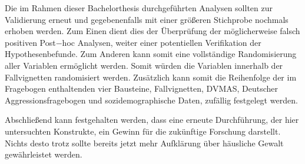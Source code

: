 Die im Rahmen dieser Bachelorthesis durchgeführten Analysen sollten zur Validierung erneut und gegebenenfalls mit einer größeren Stichprobe nochmals erhoben werden. Zum Einen dient dies der Überprüfung der möglicherweise falsch positiven Post$-$hoc Analysen, weiter einer potentiellen Verifikation der Hypothesenbefunde. Zum Anderen kann somit eine vollständige Randomisierung aller Variablen ermöglicht werden. Somit würden die Variablen innerhalb der Fallvignetten randomisiert werden. Zusätzlich kann somit die Reihenfolge der im Fragebogen enthaltenden vier Bausteine, Fallvignetten, DVMAS, Deutscher Aggressionsfragebogen und sozidemographische Daten, zufällig festgelegt werden. 


Abschließend kann festgehalten werden, dass eine erneute Durchführung, der hier untersuchten Konstrukte, ein Gewinn für die zukünftige Forschung darstellt. Nichts desto trotz sollte bereits jetzt mehr Aufklärung über häusliche Gewalt gewährleistet werden.
